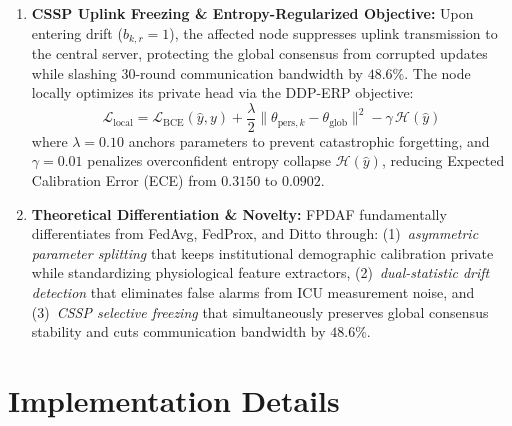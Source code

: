 \documentclass[11pt, a4paper]{article}
\begin{document}
\begin{enumerate}[leftmargin=*, noitemsep, topsep=2pt]
    \item \textbf{CSSP Uplink Freezing \& Entropy-Regularized Objective:} Upon entering drift ($b_{k, r} = 1$), the affected node suppresses uplink transmission to the central server, protecting the global consensus from corrupted updates while slashing 30-round communication bandwidth by $48.6\%$. The node locally optimizes its private head via the DDP-ERP objective:
    \begin{equation}
        \mathcal{L}_{\mathrm{local}} = \mathcal{L}_{\mathrm{BCE}}(\hat{y}, y) + \frac{\lambda}{2} \|\theta_{\mathrm{pers}, k} - \theta_{\mathrm{glob}}\|^2 - \gamma \, \mathcal{H}(\hat{y})
    \end{equation}
    where $\lambda = 0.10$ anchors parameters to prevent catastrophic forgetting, and $\gamma = 0.01$ penalizes overconfident entropy collapse $\mathcal{H}(\hat{y})$, reducing Expected Calibration Error (ECE) from $0.3150$ to $0.0902$.
    \item \textbf{Theoretical Differentiation \& Novelty:} FPDAF fundamentally differentiates from FedAvg, FedProx, and Ditto through: (1)~\textit{asymmetric parameter splitting} that keeps institutional demographic calibration private while standardizing physiological feature extractors, (2)~\textit{dual-statistic drift detection} that eliminates false alarms from ICU measurement noise, and (3)~\textit{CSSP selective freezing} that simultaneously preserves global consensus stability and cuts communication bandwidth by $48.6\%$.
\end{enumerate}

\section{Implementation Details}
\end{document}
